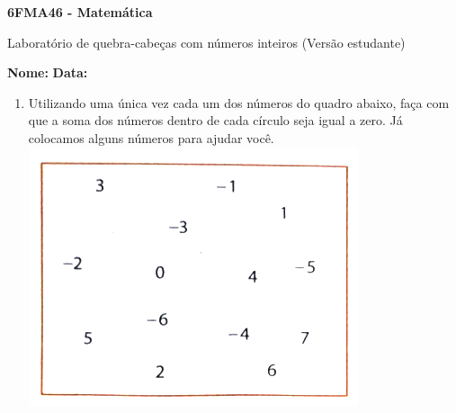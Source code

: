 \documentclass[a4paper,14pt]{article}
\begin{document}
	
	\noindent\textbf{6FMA46 - Matemática} 
	
	\begin{center}Laboratório de quebra-cabeças com números inteiros (Versão estudante)
	\end{center}
	
	\noindent\textbf{Nome:} \underline{\hspace{10cm}}
	\noindent\textbf{Data:} \underline{\hspace{4cm}}
	
	\begin{multicols}{2}
    	\begin{enumerate}
    		\item Utilizando uma única vez cada um dos números do quadro abaixo, faça com que a soma dos números dentro de cada círculo seja igual a zero. Já colocamos alguns números para ajudar você.\\
    		\includegraphics[width=0.9\linewidth]{6FMA46_imagens/imagem1}

\end{enumerate}
\end{multicols}
\end{document}
